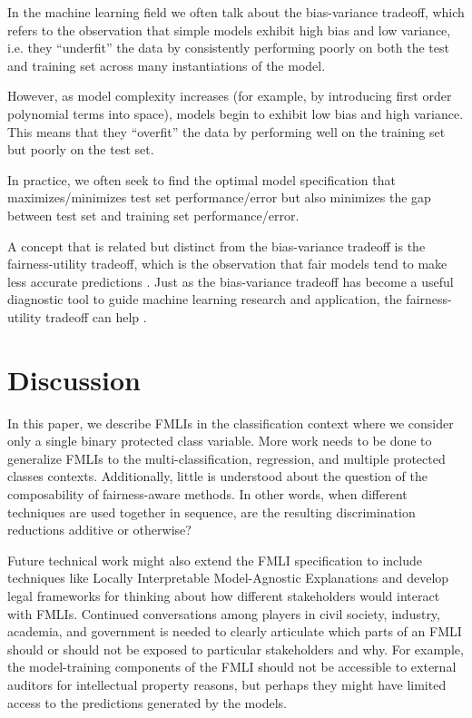 \documentclass{acm_proc_article-sp}
\begin{document}
In the machine learning field we often talk about the bias-variance tradeoff,
which refers to the observation that simple models exhibit high bias and low
variance, i.e. they ``underfit'' the data by consistently performing poorly on
both the test and training set across many instantiations of the model.

However, as model complexity increases (for example, by introducing first order
polynomial terms into space), models begin to exhibit low bias and high
variance. This means that they ``overfit'' the data by performing well on the
training set but poorly on the test set.

In practice, we often seek to find the optimal model specification that
maximizes/minimizes test set performance/error but also minimizes the gap
between test set and training set performance/error.

A concept that is related but distinct from the bias-variance tradeoff is the
fairness-utility tradeoff, which is the observation that fair models tend to
make less accurate predictions \cite{kamiran2012data, dwork2012fairness}. Just
as the bias-variance tradeoff has become a useful diagnostic tool to guide
machine learning research and application, the fairness-utility tradeoff can
help .

\section{Discussion}

In this paper, we describe FMLIs in the classification context where we consider
only a single binary protected class variable. More work needs to be done to
generalize FMLIs to the multi-classification, regression, and multiple protected
classes contexts. Additionally, little is understood about the question of the
composability of fairness-aware methods. In other words, when different
techniques are used together in sequence, are the resulting discrimination
reductions additive or otherwise?

Future technical work might also extend the FMLI specification to include
techniques like Locally Interpretable Model-Agnostic Explanations
\cite{ribeiro2016should} and develop legal frameworks for thinking about how
different stakeholders would interact with FMLIs. Continued conversations among
players in civil society, industry, academia, and government is needed to
clearly articulate which parts of an FMLI should or should not be exposed to
particular stakeholders and why. For example, the model-training components
of the FMLI should not be accessible to external auditors for intellectual
property reasons, but perhaps they might have limited access to the predictions
generated by the models.
\end{document}
